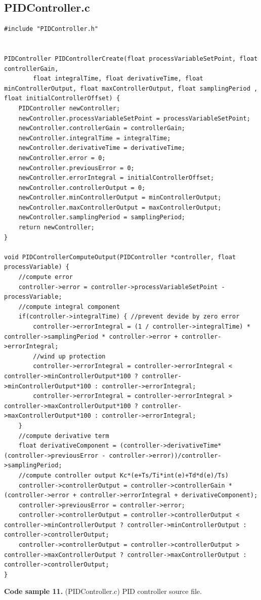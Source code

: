 \documentclass{article}
\begin{document}
\subsection{PIDController.c}
\begin{lstlisting}
#include "PIDController.h"


PIDController PIDControllerCreate(float processVariableSetPoint, float controllerGain,
    	float integralTime, float derivativeTime, float minControllerOutput, float maxControllerOutput, float samplingPeriod , float initialControllerOffset) {
	PIDController newController;
	newController.processVariableSetPoint = processVariableSetPoint;
	newController.controllerGain = controllerGain;
	newController.integralTime = integralTime;
	newController.derivativeTime = derivativeTime;
	newController.error = 0;
	newController.previousError = 0;
	newController.errorIntegral = initialControllerOffset;
	newController.controllerOutput = 0;
	newController.minControllerOutput = minControllerOutput;
	newController.maxControllerOutput = maxControllerOutput;
	newController.samplingPeriod = samplingPeriod;
	return newController;
}

void PIDControllerComputeOutput(PIDController *controller, float processVariable) {
	//compute error
	controller->error = controller->processVariableSetPoint - processVariable;
	//compute integral component
	if(controller->integralTime) { //prevent devide by zero error
    	controller->errorIntegral = (1 / controller->integralTime) * controller->samplingPeriod * controller->error + controller->errorIntegral;
    	//wind up protection
    	controller->errorIntegral = controller->errorIntegral < controller->minControllerOutput*100 ? controller->minControllerOutput*100 : controller->errorIntegral;
    	controller->errorIntegral = controller->errorIntegral > controller->maxControllerOutput*100 ? controller->maxControllerOutput*100 : controller->errorIntegral;
	}
	//compute derivative term
	float derivativeComponent = (controller->derivativeTime*(controller->previousError - controller->error))/controller->samplingPeriod;
	//compute controller output Kc*(e+Ts/Ti*int(e)+Td*d(e)/Ts)
	controller->controllerOutput = controller->controllerGain * (controller->error + controller->errorIntegral + derivativeComponent);
	controller->previousError = controller->error;
	controller->controllerOutput = controller->controllerOutput < controller->minControllerOutput ? controller->minControllerOutput : controller->controllerOutput;
	controller->controllerOutput = controller->controllerOutput > controller->maxControllerOutput ? controller->maxControllerOutput : controller->controllerOutput;
}
\end{lstlisting}
\textbf{Code sample 11.} (PIDController.c) PID controller source file.
\end{document}
